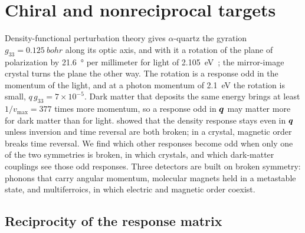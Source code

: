 \section{Chiral and nonreciprocal targets}\label{sec:14.5}

Density-functional perturbation theory gives $\alpha$-quartz the gyration $g_{33} = \SI{0.125}{bohr}$ along its optic axis, and with it a rotation of the plane of polarization by \SI{21.6}{\degree} per millimeter for light of \SI{2.105}{eV}~\cite[Table~I, Eq.~(4)]{zabalo2023natural}; the mirror-image crystal turns the plane the other way. The rotation is a response odd in the momentum of the light, and at a photon momentum of \SI{2.1}{eV} the rotation is small, $q\,g_{33} = 7\times10^{-5}$. Dark matter that deposits the same energy brings at least $1/v_{\mathrm{max}} = 377$ times more momentum, so a response odd in $\bm{q}$ may matter more for dark matter than for light.  showed that the density response stays even in $\bm{q}$ unless inversion and time reversal are both broken; in a crystal, magnetic order breaks time reversal. We find which other responses become odd when only one of the two symmetries is broken, in which crystals, and which dark-matter couplings see those odd responses. Three detectors are built on broken symmetry: phonons that carry angular momentum, molecular magnets held in a metastable state, and multiferroics, in which electric and magnetic order coexist.

\subsection{Reciprocity of the response matrix}\label{sec:14.5-recip}

